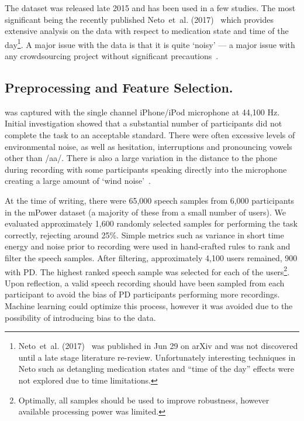 \documentclass[12pt, twoside]{book}
\renewcommand\emph[1]{\textit{\color{USred}{#1}}}
\begin{document}
The dataset was released late 2015 and has been used in a few studies. The most significant being the recently published Neto~et~al. (2017)~\cite{mpowerneto2017analysis} which provides extensive analysis on the data with respect to medication state and time of the day\footnote{Neto~et~al. (2017)~\cite{mpowerneto2017analysis} was published in Jun 29 on arXiv and was not discovered until a late stage literature re-review. Unfortunately interesting techniques in Neto such as detangling medication states and ``time of the day'' effects were not explored due to time limitations.}. A major issue with the data is that it is quite `noisy' --- a major issue with any crowdsourcing project without significant precautions~\cite{crowdsourcing}. 


\subsection{Preprocessing and Feature Selection.}
\label{mpowerprocess}
\emph{Vowel phonation} was captured with the single channel iPhone/iPod microphone at 44,100 Hz. Initial investigation showed that a substantial number of participants did not complete the task to an acceptable standard. There were often excessive levels of environmental noise, as well as  hesitation, interruptions and pronouncing vowels other than /aa/. There is also a large variation in the distance to the phone during recording with some participants speaking directly into the microphone creating a large amount of `wind noise'~\cite{windnoise}. 


At the time of writing, there were 65,000 speech samples from 6,000 participants in the mPower dataset (a majority of these from a small number of users). We evaluated approximately 1,600 randomly selected samples for performing the task correctly, rejecting around 25\%. Simple metrics such as variance in short time energy and noise prior to recording were used in hand-crafted rules to rank and filter the speech samples. After filtering, approximately 4,100 users remained, 900 with PD. The highest ranked speech sample was selected for each of the users\footnote{Optimally, all samples should be used to improve robustness, however available processing power was limited.}. Upon reflection, a valid speech recording should have been sampled from each participant to avoid the bias of PD participants performing more recordings. Machine learning could optimize this process, however it was avoided due to the possibility of introducing bias to the data. 
\end{document}

